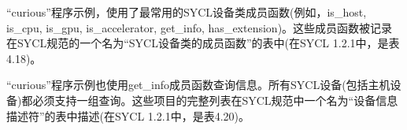 “curious”程序示例，使用了最常用的SYCL设备类成员函数(例如，is\_host, is\_cpu, is\_gpu, is\_accelerator, get\_info, has\_extension)。这些成员函数被记录在SYCL规范的一个名为“SYCL设备类的成员函数”的表中(在SYCL 1.2.1中，是表4.18)。\par

“curious”程序示例也使用get\_info成员函数查询信息。所有SYCL设备(包括主机设备)都必须支持一组查询。这些项目的完整列表在SYCL规范中一个名为“设备信息描述符”的表中描述(在SYCL 1.2.1中，是表4.20)。\par